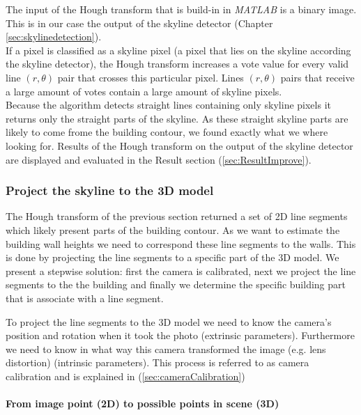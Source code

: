 	The input of the Hough transform that is build-in in \emph{MATLAB\cite{matlab}} is a binary
	image. This is in our case the output of the skyline detector (Chapter
	\ref{sec:skylinedetection}).\\
	If a pixel is classified as a skyline pixel (a pixel that lies on the
	skyline according the skyline detector), the Hough transform increases
	a vote value for every valid line $(r,\theta)$ pair that crosses this
	particular pixel.  
	Lines $(r,\theta)$ pairs that receive a large amount of votes
	contain a large amount of skyline pixels.\\
	Because the algorithm detects straight lines containing only skyline pixels
	it returns only the straight parts of the skyline.
	As these straight skyline parts are likely to come frome the building
	contour, we found exactly what we where looking for.
	Results of the Hough transform on the output of the skyline detector are
	displayed and evaluated in the Result section (\ref{sec:ResultImprove}).

\subsubsection{Project the skyline to the 3D model}
\label{sec:project}

	The Hough transform of the previous section returned a set of 2D line
	segments which likely present parts of the building contour.  
	As we want to estimate the building wall heights we need to correspond these
	line segments to the walls.  This is done by projecting the line segments to a specific part of the 3D model.  
	We present a stepwise solution: first the camera is calibrated, next we
	project the line segments to the the building and finally we 
	determine the specific building part that is associate with a line segment.

	To project the line segments to the 3D model we need to know the
	camera's position and rotation when it took the photo (extrinsic
	parameters). Furthermore we need to know in what way this camera transformed
	the image (e.g. lens distortion) (intrinsic parameters).
	This process is referred to as camera calibration and is explained in 
	(\ref{sec:cameraCalibration})
	 
	\paragraph{From image point (2D) to possible points in scene (3D)} 

